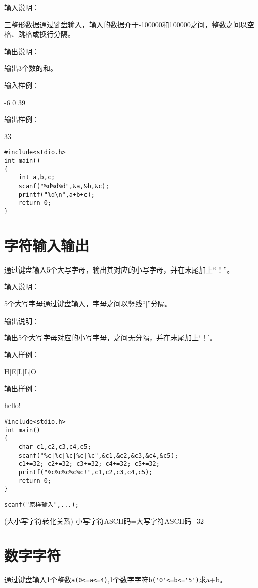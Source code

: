 输入说明：

三整形数据通过键盘输入，输入的数据介于-100000和100000之间，整数之间以空格、跳格或换行分隔。 

输出说明：

输出3个数的和。

输入样例：

-6  0  39

输出样例：

33

\begin{lstlisting}
#include<stdio.h>  
int main()                   
{  
	int a,b,c;
	scanf("%d%d%d",&a,&b,&c);
	printf("%d\n",a+b+c); 
	return 0;           
}           
\end{lstlisting}

\section{字符输入输出}
通过键盘输入5个大写字母，输出其对应的小写字母，并在末尾加上“！”。

输入说明：

5个大写字母通过键盘输入，字母之间以竖线“|”分隔。

输出说明：

输出5个大写字母对应的小写字母，之间无分隔，并在末尾加上‘！’。

输入样例：

H|E|L|L|O

输出样例：

hello!

\begin{lstlisting}
#include<stdio.h>     
int main()                   
{  
	char c1,c2,c3,c4,c5;
	scanf("%c|%c|%c|%c|%c",&c1,&c2,&c3,&c4,&c5);
	c1+=32; c2+=32; c3+=32; c4+=32; c5+=32;
	printf("%c%c%c%c%c!",c1,c2,c3,c4,c5); 
	return 0;           
}           
\end{lstlisting}

\begin{note}[要点]
	\lstinline|scanf("原样输入",...);|
\end{note}

\begin{note}(大小写字符转化关系)
	小写字符ASCII码=大写字符ASCII码+32
\end{note}

\section{数字字符}
通过键盘输入1个整数\lstinline|a(0<=a<=4)|,1个数字字符\lstinline|b('0'<=b<='5')|求a+b。

